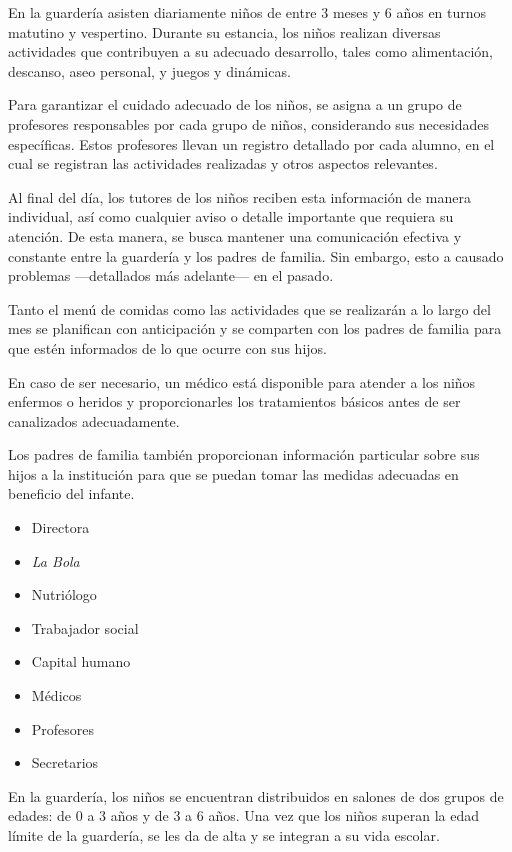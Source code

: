 \documentclass{article}
\begin{document}
En la guardería asisten diariamente niños de entre 3 meses y 6 años en turnos matutino y vespertino. Durante su estancia, los niños realizan diversas actividades que contribuyen a su adecuado desarrollo, tales como alimentación, descanso, aseo personal, y juegos y dinámicas.

Para garantizar el cuidado adecuado de los niños, se asigna a un grupo de profesores responsables por cada grupo de niños, considerando sus necesidades específicas. Estos profesores llevan un registro detallado por cada alumno, en el cual se registran las actividades realizadas y otros aspectos relevantes.

Al final del día, los tutores de los niños reciben esta información de manera individual, así como cualquier aviso o detalle importante que requiera su atención. De esta manera, se busca mantener una comunicación efectiva y constante entre la guardería y los padres de familia. Sin embargo, esto a causado problemas ---detallados más adelante--- en el pasado.

Tanto el menú de comidas como las actividades que se realizarán a lo largo del mes se planifican con anticipación y se comparten con los padres de familia para que estén informados de lo que ocurre con sus hijos.

En caso de ser necesario, un médico está disponible para atender a los niños enfermos o heridos y proporcionarles los tratamientos básicos antes de ser canalizados adecuadamente.

Los padres de familia también proporcionan información particular sobre sus hijos a la institución para que se puedan tomar las medidas adecuadas en beneficio del infante.

\begin{itemize}
	\item Directora
	\item \emph{La Bola}
	\item Nutriólogo
	\item Trabajador social
	\item Capital humano
	\item Médicos
	\item Profesores
	\item Secretarios
\end{itemize}

En la guardería, los niños se encuentran distribuidos en salones de dos grupos de edades: de 0 a 3 años y de 3 a 6 años. Una vez que los niños superan la edad límite de la guardería, se les da de alta y se integran a su vida escolar.
\end{document}
